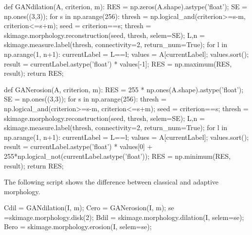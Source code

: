 \begin{python}
def GANdilation(A, criterion, m):
    RES = np.zeros(A.shape).astype('float');
    SE = np.ones((3,3));
    for s in np.arange(256):
        thresh = np.logical_and(criterion>=s-m, criterion<=s+m);
        seed = criterion==s;
        thresh = skimage.morphology.reconstruction(seed, thresh, selem=SE);
        L,n = skimage.measure.label(thresh, connectivity=2, return_num=True);
        for l in np.arange(1, n+1):
            currentLabel = L==l;
            values = A[currentLabel];
            values.sort();
            result = currentLabel.astype('float') * values[-1];
            RES = np.maximum(RES, result);
    return RES;

\end{python}

\begin{python}
def GANerosion(A, criterion, m):
    RES = 255 * np.ones(A.shape).astype('float');
    SE = np.ones((3,3));
    for s in np.arange(256):
        thresh = np.logical_and(criterion>=s-m, criterion<=s+m);
        seed = criterion==s;
        thresh = skimage.morphology.reconstruction(seed, thresh, selem=SE);
        L,n = skimage.measure.label(thresh, connectivity=2, return_num=True);
        for l in np.arange(1, n+1):
            currentLabel = L==l;
            values = A[currentLabel];
            values.sort();
            result = currentLabel.astype('float') * values[0] + 255*np.logical_not(currentLabel.astype('float'));
            RES = np.minimum(RES, result);
    return RES;

\end{python}

The following script shows the difference between classical and adaptive morphology.

\begin{python}
Cdil = GANdilation(I, m);
Cero = GANerosion(I, m);
se =skimage.morphology.disk(2);
Bdil = skimage.morphology.dilation(I, selem=se);
Bero = skimage.morphology.erosion(I, selem=se);
\end{python}

